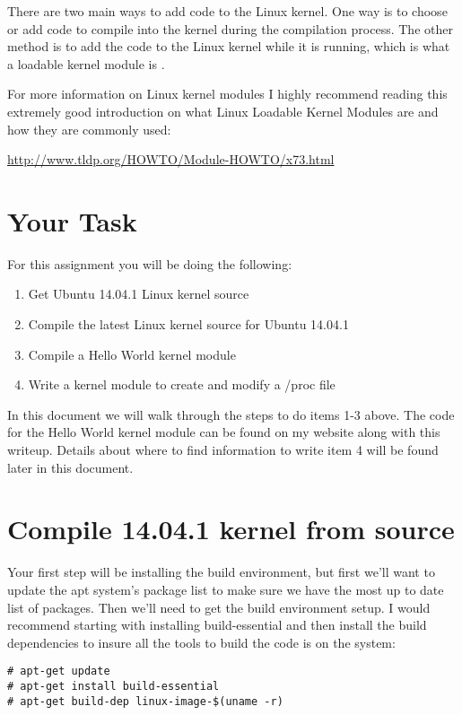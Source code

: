 \documentclass[11pt]{article}
\begin{document}
There are two main ways to add code to the Linux kernel. One way is to choose or add code to compile into the kernel during the compilation process. The other method is to add the code to the Linux kernel while it is running, which is what a loadable kernel module is \cite{tldp}.

For more information on Linux kernel modules I highly recommend reading this extremely good introduction on what Linux Loadable Kernel Modules are and how they are commonly used:

{\url{http://www.tldp.org/HOWTO/Module-HOWTO/x73.html}}


\section*{Your Task}

For this assignment you will be doing the following:

\begin{enumerate}
\item{Get Ubuntu 14.04.1 Linux kernel source}
\item{Compile the latest Linux kernel source for Ubuntu 14.04.1}
\item{Compile a Hello World kernel module}
\item{Write a kernel module to create and modify a /proc file}
\end{enumerate}

In this document we will walk through the steps to do items 1-3 above. The code for the Hello World kernel module can be found on my website along with this writeup. Details about where to find information to write item 4 will be found later in this document. 



\section*{Compile 14.04.1 kernel from source}
Your first step will be installing the build environment, but first we'll want to update the apt system's package list to make sure we have the most up to date list of packages. Then we'll need to get the build environment setup. I would recommend starting with installing build-essential and then install the build dependencies to insure all the tools to build the code is on the system:

\begin{verbatim}
# apt-get update
# apt-get install build-essential
# apt-get build-dep linux-image-$(uname -r)
\end{verbatim}
\end{document}
